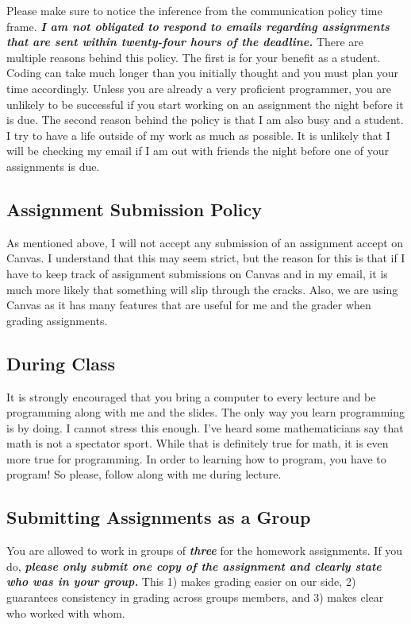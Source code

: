 \documentclass[11pt]{article}
\begin{document}
Please make sure to notice the inference from the communication policy time frame. \textit{\textbf{I am not obligated to respond to emails regarding assignments that are sent within twenty-four hours of the deadline.}} There are multiple reasons behind this policy. The first is for your benefit as a student. Coding can take much longer than you initially thought and you must plan your time accordingly. Unless you are already a very proficient programmer, you are unlikely to be successful if you start working on an assignment the night before it is due. The second reason behind the policy is that I am also busy and a student. I try to have a life outside of my work as much as possible. It is unlikely that I will be checking my email if I am out with friends the night before one of your assignments is due. 

\subsection*{Assignment Submission Policy}

As mentioned above, I will not accept any submission of an assignment accept on Canvas. I understand that this may seem strict, but the reason for this is that if I have to keep track of assignment submissions on Canvas and in my email, it is much more likely that something will slip through the cracks. Also, we are using Canvas as it has many features that are useful for me and the grader when grading assignments. 

\subsection*{During Class}
It is strongly encouraged that you bring a computer to every lecture and be programming along with me and the slides. The only way you learn programming is by doing. I cannot stress this enough. I've heard some mathematicians say that math is not a spectator sport. While that is definitely true for math, it is even more true for programming. In order to learning how to program, you have to program! So please, follow along with me during lecture. 

\subsection*{Submitting Assignments as a Group}
You are allowed to work in groups of \textit{\textbf{three}} for the homework assignments. If you do, \textit{\textbf{please only submit one copy of the assignment and clearly state who was in your group.}} This 1) makes grading easier on our side, 2) guarantees consistency in grading across groups members, and 3) makes clear who worked with whom.
\end{document}
